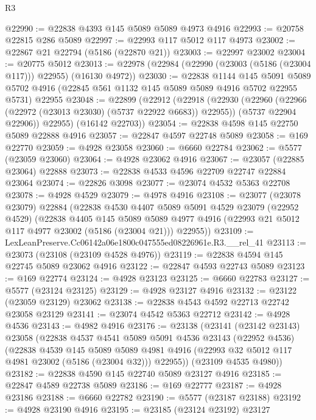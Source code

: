 \begin{lexlean}{R3}
\begin{coremodule}
@22990 := @22838 @4393 @145 @5089 @5089 @4973 @4916
@22993 := @20758 @22815 @286 @5089
@22997 := @22993 @117 @5012 @117 @4973
@23002 := @22867 @21 @22794 (@5186 (@22870 @21))
@23003 := @22997 @23002
@23004 := @20775 @5012
@23013 := @22978 (@22984 (@22990 (@23003 (@5186 (@23004 @117))) @22955) (@16130 @4972))
@23030 := @22838
    @1144
    @145
    @5091
    @5089
    @5702
    @4916
    (@22845 @561 @1132 @145 @5089 @5089 @4916 @5702 @22955 @5731)
    @22955
@23048 := @22899
    (@22912
      (@22918
        (@22930
          (@22960 (@22966 (@22972 (@23013 @23030) (@5737 @22922 @6683)) @22955))
          (@5737 @22904 @22906))
        @22955)
      (@16142 @22703))
@23054 := @22838 @4598 @145 @22750 @5089 @22888 @4916
@23057 := @22847 @4597 @22748 @5089
@23058 := @169 @22770
@23059 := @4928 @23058
@23060 := @6660 @22784
@23062 := @5577 (@23059 @23060)
@23064 := @4928 @23062 @4916
@23067 := @23057 (@22885 @23064) @22888
@23073 := @22838 @4533 @4596 @22709 @22747 @22884 @23064
@23074 := @22826 @3098
@23077 := @23074 @4532 @5363 @22708
@23078 := @4928 @4529
@23079 := @4978 @4916
@23108 := @23077
    (@23078 @23079)
    @22884
    (@22838
      @4530
      @4407
      @5089
      @5091
      @4529
      @23079
      (@22952 @4529)
      (@22838
        @4405
        @145
        @5089
        @5089
        @4977
        @4916
        (@22993 @21 @5012 @117 @4977 @23002 (@5186 (@23004 @21)))
        @22955))
@23109 := LexLeanPreserve.Cc06142a06e1800c047555ed08226961e.R3.__rel_41
@23113 := @23073 (@23108 (@23109 @4528 @4976))
@23119 := @22838 @4594 @145 @22745 @5089 @23062 @4916
@23122 := @22847 @4593 @22743 @5089
@23123 := @169 @22774
@23124 := @4928 @23123
@23125 := @6660 @22783
@23127 := @5577 (@23124 @23125)
@23129 := @4928 @23127 @4916
@23132 := @23122 (@23059 @23129) @23062
@23138 := @22838 @4543 @4592 @22713 @22742 @23058 @23129
@23141 := @23074 @4542 @5363 @22712
@23142 := @4928 @4536
@23143 := @4982 @4916
@23176 := @23138
    (@23141
      (@23142 @23143)
      @23058
      (@22838
        @4537
        @4541
        @5089
        @5091
        @4536
        @23143
        (@22952 @4536)
        (@22838
          @4539
          @145
          @5089
          @5089
          @4981
          @4916
          (@22993 @32 @5012 @117 @4981 @23002 (@5186 (@23004 @32)))
          @22955))
      (@23109 @4535 @4980))
@23182 := @22838 @4590 @145 @22740 @5089 @23127 @4916
@23185 := @22847 @4589 @22738 @5089
@23186 := @169 @22777
@23187 := @4928 @23186
@23188 := @6660 @22782
@23190 := @5577 (@23187 @23188)
@23192 := @4928 @23190 @4916
@23195 := @23185 (@23124 @23192) @23127

\end{coremodule}
\end{lexlean}
